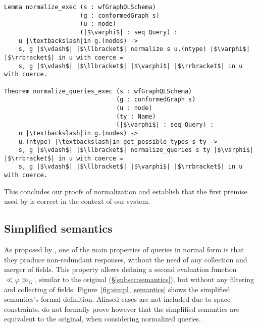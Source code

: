 {\begin{verbatim}
Lemma normalize_exec (s : wfGraphQLSchema)
                     (g : conformedGraph s)
                     (u : node)
                     (|$\varphi$| : seq Query) :
    u |\textbackslash|in g.(nodes) ->
    s, g |$\vdash$| |$\llbracket$| normalize s u.(ntype) |$\varphi$| |$\rrbracket$| in u with coerce =
    s, g |$\vdash$| |$\llbracket$| |$\varphi$| |$\rrbracket$| in u with coerce.

Theorem normalize_queries_exec (s : wfGraphQLSchema)
                               (g : conformedGraph s)
                               (u : node)
                               (ty : Name)
                               (|$\varphi$| : seq Query) :
    u |\textbackslash|in g.(nodes) ->
    u.(ntype) |\textbackslash|in get_possible_types s ty ->
    s, g |$\vdash$| |$\llbracket$| normalize_queries s ty |$\varphi$| |$\rrbracket$| in u with coerce =
    s, g |$\vdash$| |$\llbracket$| |$\varphi$| |$\rrbracket$| in u with coerce.

\end{verbatim}

This concludes our proofs of normalization and establish that the first premise used by \HP is correct in the context of our system.

\subsection{Simplified semantics}

As proposed by \HP, one of the main properties of queries in normal form is that they produce non-redundant responses, without the need of any collection and merger of fields. This property allows defining a second evaluation function $\ll \varphi \gg_{G}$, similar to the original (\S\ref{subsec:semantics}), but without any filtering and collecting of fields. Figure~\ref{fig:simpl_semantics} shows the simplified semantics's formal definition. Aliased cases are not included due to space constraints.
\HP do not formally prove however that the simplified semantics are equivalent to the original, when considering normalized queries.

}
